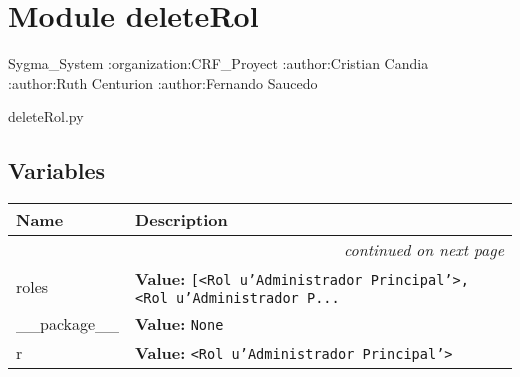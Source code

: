 %
%
%


\section{Module deleteRol}

    \label{deleteRol}
Sygma\_System :organization:CRF\_Proyect :author:Cristian Candia 
:author:Ruth Centurion :author:Fernando Saucedo

deleteRol.py



  \subsection{Variables}

    \vspace{-1cm}
\hspace{\varindent}\begin{longtable}{|p{\varnamewidth}|p{\vardescrwidth}|l}
\cline{1-2}
\cline{1-2} \centering \textbf{Name} & \centering \textbf{Description}& \\
\cline{1-2}
\endhead\cline{1-2}\multicolumn{3}{r}{\small\textit{continued on next page}}\\\endfoot\cline{1-2}
\endlastfoot\raggedright r\-o\-l\-e\-s\- & \raggedright \textbf{Value:} 
{\tt \texttt{[}{\textless}Rol u'Administrador Principal'{\textgreater}\texttt{, }{\textless}Rol u'Administrador P\texttt{...}}&\\
\cline{1-2}
\raggedright \_\-\_\-p\-a\-c\-k\-a\-g\-e\-\_\-\_\- & \raggedright \textbf{Value:} 
{\tt None}&\\
\cline{1-2}
\raggedright r\- & \raggedright \textbf{Value:} 
{\tt {\textless}Rol u'Administrador Principal'{\textgreater}}&\\
\cline{1-2}
\end{longtable}

